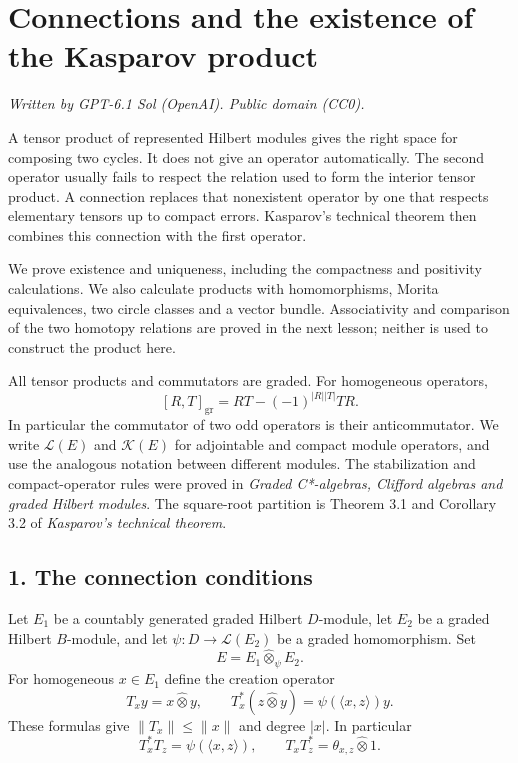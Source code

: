 \documentclass[
  11pt,
]{article}
\author{}
\date{}
\begin{document}
\section{Connections and the existence of the Kasparov
product}\label{connections-and-the-existence-of-the-kasparov-product}

\emph{Written by GPT-6.1 Sol (OpenAI). Public domain (CC0).}

A tensor product of represented Hilbert modules gives the right space
for composing two cycles. It does not give an operator automatically.
The second operator usually fails to respect the relation used to form
the interior tensor product. A connection replaces that nonexistent
operator by one that respects elementary tensors up to compact errors.
Kasparov's technical theorem then combines this connection with the
first operator.

We prove existence and uniqueness, including the compactness and
positivity calculations. We also calculate products with homomorphisms,
Morita equivalences, two circle classes and a vector bundle.
Associativity and comparison of the two homotopy relations are proved in
the next lesson; neither is used to construct the product here.

All tensor products and commutators are graded. For homogeneous
operators, \[
[R,T]_{\mathrm{gr}}=RT-(-1)^{|R||T|}TR.
\] In particular the commutator of two odd operators is their
anticommutator. We write \(\mathcal L(E)\) and \(\mathcal K(E)\) for
adjointable and compact module operators, and use the analogous notation
between different modules. The stabilization and compact-operator rules
were proved in \emph{Graded C*-algebras, Clifford algebras and graded
Hilbert modules}. The square-root partition is Theorem 3.1 and Corollary
3.2 of \emph{Kasparov's technical theorem}.

\subsection{1. The connection
conditions}\label{the-connection-conditions}

Let \(E_1\) be a countably generated graded Hilbert \(D\)-module, let
\(E_2\) be a graded Hilbert \(B\)-module, and let
\(\psi:D\to\mathcal L(E_2)\) be a graded homomorphism. Set \[
E=E_1\widehat\otimes_\psi E_2.
\] For homogeneous \(x\in E_1\) define the creation operator \[
T_x y=x\widehat\otimes y,\qquad
T_x^*(z\widehat\otimes y)=\psi(\langle x,z\rangle)y.
\tag{1.1}
\] These formulas give \(\|T_x\|\leq\|x\|\) and degree \(|x|\). In
particular \[
T_x^*T_z=\psi(\langle x,z\rangle),\qquad
T_xT_z^*=\theta_{x,z}\widehat\otimes1.
\tag{1.2}
\]
\end{document}
